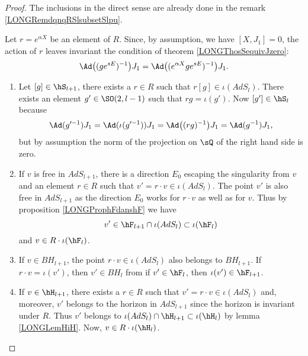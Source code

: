 \begin{proof}
    The inclusions in the direct sense are already done in the remark \ref{LONGRemdqnqRSlsubsetSlpu}.

    Let $r= e^{\alpha X}$ be an element of $R$. Since, by assumption, we have $[X,J_1]=0$, the action of $r$ leaves invariant the condition of theorem \eqref{LONGThosSequivJzero}:
    \begin{equation}        \label{LONGEqalpharjnagitpas}
        \Ad\big( (g e^{sE})^{-1} \big)J_1=\Ad\big( ( e^{\alpha X}g e^{sE})^{-1} \big)J_1.
    \end{equation}
    \begin{enumerate}
        \item
            Let $[g]\in\hS_{l+1}$, there exists a $r\in R$ such that $r[g]\in \iota(AdS_l)$. There exists an element $g'\in \SO(2,l-1)$ such that $rg=\iota(g')$. Now $[g']\in\hS_l$ because
            \begin{equation}
                \Ad(g'^{-1})J_1=\Ad(\iota(g'^{-1}))J_1=\Ad\big(  (rg)^{-1} \big)J_1=\Ad(g^{-1})J_1,
            \end{equation}
            but by assumption the norm of the projection on $\sQ$ of the right hand side is zero.

        \item
            If $v$ is free in $AdS_{l+1}$, there is a direction $E_0$ escaping the singularity from $v$ and an element $r\in R$ such that $v'=r\cdot v\in\iota(AdS_l)$. The point $v'$ is also free in $AdS_{l+1}$ as the direction $E_0$ works for $r\cdot v$ as well as for $v$. Thus by proposition \ref{LONGProphFdanshF} we have
            \begin{equation}
                v'\in\hF_{l+1}\cap\iota(AdS_l)\subset\iota(\hF_l)
            \end{equation}
            and $v\in R\cdot\iota(\hF_l)$.
        \item
            If $v\in BH_{l+1}$, the point $r\cdot v\in\iota(AdS_l)$ also belongs to $BH_{l+1}$. If $r\cdot v=\iota(v')$, then $v'\in BH_l$ from if $v'\in\hF_l$, then $\iota(v')\in\hF_{l+1}$.
        \item
            If $v\in\hH_{l+1}$, there exists a $r\in R$ such that $v'=r\cdot v\in\iota(AdS_l)$ and, moreover, $v'$ belongs to the horizon in $AdS_{l+1}$ since the horizon is invariant under $R$. Thus $v'$ belongs to $\iota(AdS_l)\cap\hH_{l+1}\subset \iota(\hH_l)$ by lemma \ref{LONGLemHiH}.  Now, $v\in R\cdot\iota(\hH_l)$.

    \end{enumerate}
\end{proof}

